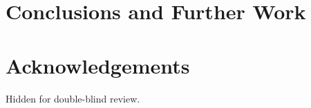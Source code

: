 \documentclass{sig-alternate}
\begin{document}



\section{Conclusions and Further Work}
\label{sec:conclusions}


\section{Acknowledgements}

Hidden for double-blind review. 

%

\begin{footnotesize}

\end{footnotesize}
\end{document}
